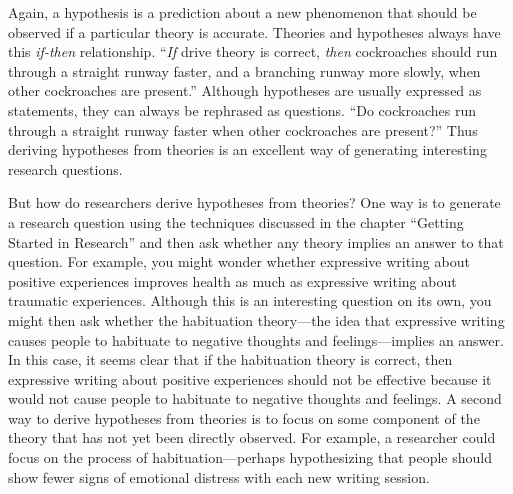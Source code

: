 \documentclass[
]{krantz}
\begin{document}
Again, a hypothesis is a prediction about a new phenomenon that should be observed if a particular theory is accurate. Theories and hypotheses always have this \emph{if-then} relationship. ``\emph{If} drive theory is correct, \emph{then} cockroaches should run through a straight runway faster, and a branching runway more slowly, when other cockroaches are present.'' Although hypotheses are usually expressed as statements, they can always be rephrased as questions. ``Do cockroaches run through a straight runway faster when other cockroaches are present?'' Thus deriving hypotheses from theories is an excellent way of generating interesting research questions.

But how do researchers derive hypotheses from theories? One way is to generate a research question using the techniques discussed in the chapter ``Getting Started in Research'' and then ask whether any theory implies an answer to that question. For example, you might wonder whether expressive writing about positive experiences improves health as much as expressive writing about traumatic experiences. Although this is an interesting question on its own, you might then ask whether the habituation theory---the idea that expressive writing causes people to habituate to negative thoughts and feelings---implies an answer. In this case, it seems clear that if the habituation theory is correct, then expressive writing about positive experiences should not be effective because it would not cause people to habituate to negative thoughts and feelings. A second way to derive hypotheses from theories is to focus on some component of the theory that has not yet been directly observed. For example, a researcher could focus on the process of habituation---perhaps hypothesizing that people should show fewer signs of emotional distress with each new writing session.
\end{document}
